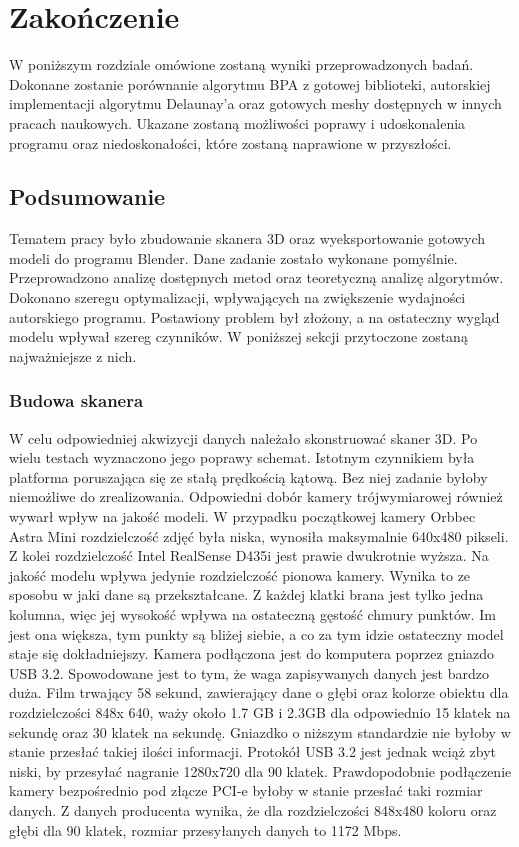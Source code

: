 \chapter{Zakończenie}
W poniższym rozdziale omówione zostaną wyniki przeprowadzonych badań. Dokonane zostanie porównanie algorytmu BPA z gotowej biblioteki, autorskiej implementacji algorytmu Delaunay'a oraz gotowych meshy dostępnych w innych pracach naukowych. Ukazane zostaną możliwości poprawy i udoskonalenia programu oraz niedoskonałości, które zostaną naprawione w przyszłości. 

\section{Podsumowanie}
Tematem pracy było zbudowanie skanera 3D oraz wyeksportowanie gotowych modeli do programu Blender. Dane zadanie zostało wykonane pomyślnie. Przeprowadzono analizę dostępnych metod oraz teoretyczną analizę algorytmów. Dokonano szeregu optymalizacji, wpływających na zwiększenie wydajności autorskiego programu. Postawiony problem był złożony, a na ostateczny wygląd modelu wpływał szereg czynników. W poniższej sekcji przytoczone zostaną najważniejsze z nich.
\subsection{Budowa skanera}
W celu odpowiedniej akwizycji danych należało skonstruować skaner 3D. Po wielu testach wyznaczono jego poprawy schemat. Istotnym czynnikiem była platforma poruszająca się ze stałą prędkością kątową. Bez niej zadanie byłoby niemożliwe do zrealizowania. Odpowiedni dobór kamery trójwymiarowej również wywarł wpływ na jakość modeli. W przypadku początkowej kamery Orbbec Astra Mini rozdzielczość zdjęć była niska, wynosiła maksymalnie 640x480 pikseli. Z kolei rozdzielczość Intel RealSense D435i jest prawie dwukrotnie wyższa. Na jakość modelu wpływa jedynie rozdzielczość pionowa kamery. Wynika to ze sposobu w jaki dane są przekształcane. Z każdej klatki brana jest tylko jedna kolumna, więc jej wysokość wpływa na ostateczną gęstość chmury punktów. Im jest ona większa, tym punkty są bliżej siebie, a co za tym idzie ostateczny model staje się dokładniejszy. Kamera podłączona jest do komputera poprzez gniazdo USB 3.2. Spowodowane jest to tym, że waga zapisywanych danych jest bardzo duża. Film trwający 58 sekund, zawierający dane o głębi oraz kolorze obiektu dla rozdzielczości 848x 640, waży około 1.7 GB i 2.3GB dla odpowiednio 15 klatek na sekundę oraz 30 klatek na sekundę. Gniazdko o niższym standardzie nie byłoby w stanie przesłać takiej ilości informacji. Protokół USB 3.2 jest jednak wciąż zbyt niski, by przesyłać nagranie 1280x720 dla 90 klatek. Prawdopodobnie podłączenie kamery bezpośrednio pod złącze PCI-e byłoby w stanie przesłać taki rozmiar danych. Z danych producenta wynika, że dla rozdzielczości 848x480 koloru oraz głębi dla 90 klatek, rozmiar przesyłanych danych to 1172 Mbps.

